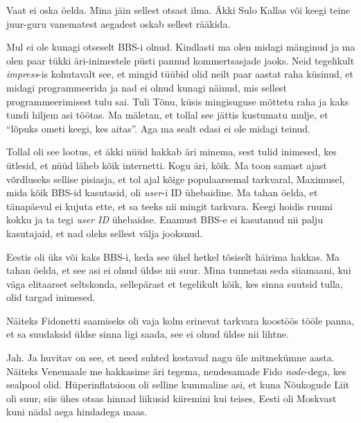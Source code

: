 Vaat ei oska öelda. Mina jäin sellest otsast ilma. Äkki Sulo 
Kallas või keegi teine juur-guru vanematest aegadest 
oskab sellest rääkida. 


Mul ei ole kunagi otseselt BBS-i olnud. Kindlasti ma olen midagi mänginud ja ma 
olen paar tükki  äri-inimestele püsti pannud  kommertsasjade jaoks. Neid 
tegelikult \emph{impress}-is kohutavalt see, et  mingid tüübid olid neilt paar 
aastat raha küsinud, et midagi programmeerida ja nad ei olnud kunagi näinud, 
mis sellest programmeerimisest tulu sai.  Tuli Tõnu, küsis mingisuguse mõttetu 
raha ja kaks tundi hiljem asi töötas. Ma mäletan, et tollal see jättis 
kustumatu mulje, et \enquote{lõpuks ometi keegi, kes aitas}. Aga ma sealt edasi 
ei ole midagi teinud. 


Tollal oli see lootus, et äkki nüüd hakkab äri minema, sest tulid inimesed, kes 
ütlesid, et nüüd läheb kõik internetti. Kogu äri, kõik. Ma toon samast ajast 
võrdluseks sellise pisiasja, et  tol ajal kõige populaarsemal tarkvaral, 
Maximusel, mida kõik BBS-id kasutasid, oli \emph{user}-i  ID  ühebaidine. Ma 
tahan öelda, et tänapäeval  ei kujuta ette, et sa teeks nii mingit tarkvara. 
Keegi hoidis ruumi kokku ja ta tegi \emph{user ID} ühebaidse. Enamust BBS-e ei 
kasutanud nii palju kasutajaid, et nad oleks sellest välja jooksnud. 


Eestis oli üks või kaks BBS-i, keda see ühel hetkel tõsiselt häirima hakkas. Ma 
tahan öelda, et see asi ei olnud üldse nii suur. Mina tunnetan seda siiamaani, 
kui väga elitaarset seltskonda, sellepärast et tegelikult kõik, kes sinna 
suutsid tulla, olid targad inimesed. 

Näiteks Fidonetti saamiseks oli vaja kolm erinevat tarkvara koostöös tööle 
panna, et sa suudaksid üldse sinna ligi saada, see ei olnud üldse nii lihtne. 


Jah. Ja huvitav on see, et need suhted kestavad nagu üle mitmekümne aasta. 
Näiteks Venemaale me hakkasime äri tegema, nendesamade Fido \emph{node}-dega, 
kes sealpool olid. Hüperinflatsioon oli selline kummaline asi, et kuna 
Nõukogude Liit oli suur, siis ühes otsas hinnad liikusid kiiremini kui teises, 
Eesti oli Moskvast kuni nädal aega hindadega maas. 

